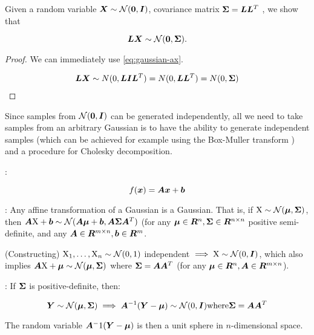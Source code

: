 \begin{thm}
    Given a random variable ${\bm{X}} \sim {\mathcal{N}}({\bm{0}}, {\bm{I}})$, covariance matrix ${\bm{\Sigma}} = {\bm{L}} {\bm{L}}^T$ , we show that
    
    \begin{equation}
        {\bm{L}} {\bm{X}} \sim {\mathcal{N}}({\bm{0}}, {\bm{\Sigma}}).
    \end{equation}
    
    \begin{proof}
    We can immediately use \eqref{eq:gaussian-ax}.
    
    \begin{align}
    {\bm{L}} {\bm{X}} \sim N(0, {\bm{L}} {\bm{I}} {\bm{L}}^T) = N(0, {\bm{L}} {\bm{L}}^T) = N(0, {\bm{\Sigma}})
    \end{align}
    \end{proof}
\end{thm}

Since samples from ${\mathcal{N}}({\bm{0}}, {\bm{I}})$ can be generated independently, all we need to take samples from an arbitrary Gaussian is to have the ability to generate independent samples (which can be achieved for example using the Box-Muller transform ) and a procedure for Cholesky decomposition.

\begin{defn}
    :
    
    \begin{equation}
        f({\bm{x}}) = {\bm{A}} {\bm{x}} + {\bm{b}}
    \end{equation}
\end{defn}
    
\begin{thm}
    : Any affine transformation of a Gaussian is a Gaussian. That is, if ${\textnormal{X}} \sim {\mathcal{N}}({\bm{\mu}}, {\bm{\Sigma}})$, then ${\bm{A}} {\textnormal{X}} + {\bm{b}} \sim {\mathcal{N}}({\bm{A}} {\bm{\mu}} + {\bm{b}}, {\bm{A}} {\bm{\Sigma}} {\bm{A}}^T)$ (for any ${\bm{\mu}} \in {\bm{R}}^n, {\bm{\Sigma}} \in {\bm{R}}^{n \times n}$ positive semi-definite, and any ${\bm{A}} \in {\bm{R}}^{m \times n}, {\bm{b}} \in {\bm{R}}^m$.
    
    (Constructing) ${\textnormal{X}}_1, \dots, {\textnormal{X}}_n \sim {\mathcal{N}}(0, 1)$ independent $\implies {\textnormal{X}} \sim {\mathcal{N}}(0, {\bm{I}})$, which also implies ${\bm{A}} {\textnormal{X}} + {\bm{\mu}} \sim {\mathcal{N}}({\bm{\mu}}, {\bm{\Sigma}})$ where ${\bm{\Sigma}} = {\bm{A}} {\bm{A}}^T$ (for any ${\bm{\mu}} \in {\bm{R}}^n, {\bm{A}} \in {\bm{R}}^{m \times n}$).
\end{thm}
    
\begin{thm}
    : If ${\bm{\Sigma}}$ is positive-definite, then:
    
    \begin{equation}
        {\bm{Y}} \sim {\mathcal{N}}({\bm{\mu}}, {\bm{\Sigma}}) \implies {\bm{A}}^{-1} ({\bm{Y}} - {\bm{\mu}}) \sim {\mathcal{N}}(0, {\bm{I}}) \text{where} {\bm{\Sigma}} = {\bm{A}} {\bm{A}}^T
    \end{equation}
    
    The random variable ${\bm{A}}^-1 ({\bm{Y}} - {\bm{\mu}})$ is then a unit sphere in $n$-dimensional space.
\end{thm}

